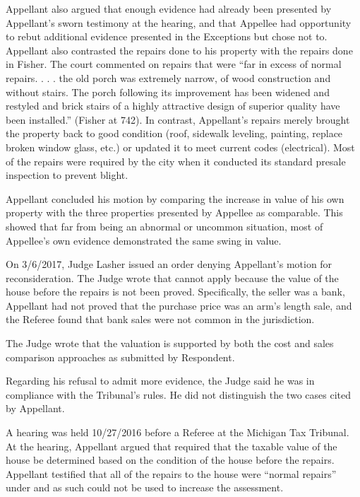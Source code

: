 Appellant also argued that enough evidence had already been presented by Appellant's sworn testimony at the hearing, and that Appellee had opportunity to rebut additional evidence presented in the Exceptions but chose not to.
Appellant also contrasted the repairs done to his property with the repairs done in Fisher. The court commented on repairs that were “far in excess of normal repairs. . . . the old porch was extremely narrow, of wood construction and without stairs. The porch following its improvement has been widened and restyled and brick stairs of a highly attractive design of superior quality have been installed.” (Fisher at 742). In contrast, Appellant's repairs merely brought the property back to good condition (roof, sidewalk leveling, painting, replace broken window glass, etc.) or updated it to meet current codes (electrical). Most of the repairs were required by the city when it conducted its standard presale inspection to prevent blight.

Appellant concluded his motion by comparing the increase in value of his own property with the three properties presented by Appellee as comparable. This showed that far from being an abnormal or uncommon situation, most of Appellee's own evidence demonstrated the same swing in value. 

On 3/6/2017, Judge Lasher issued an order denying Appellant's motion for reconsideration. The Judge wrote that  cannot apply because the value of the house before the repairs is not been proved. Specifically, the seller was a bank, Appellant had not proved that the purchase price was an arm's length sale, and the Referee found that bank sales were not common in the jurisdiction. 

The Judge wrote that the valuation is supported by both the cost and sales comparison approaches as submitted by Respondent. 

Regarding his refusal to admit more evidence, the Judge said he was in compliance with the Tribunal's rules. He did not distinguish the two cases cited by Appellant. 



A hearing was held 10/27/2016 before a Referee at the Michigan Tax Tribunal. At the hearing, Appellant argued that  required that the taxable value of the house be determined based on the condition of the house before the repairs. Appellant testified that all of the repairs to the house were ``normal repairs'' under  and as such could not be used to increase the assessment. 

